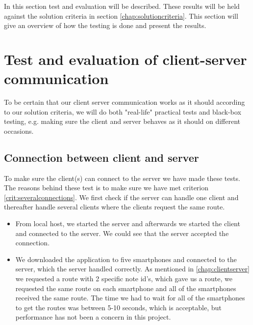 In this section test and evaluation will be described. These results will be held against the solution criteria in section \ref{chap:solutioncriteria}. This section will  give an overview of how the testing is done and present the results.

\section{Test and evaluation of client-server communication}
To be certain that our client server communication works as it should according to our solution criteria, we will do both "real-life" practical tests and black-box testing, e.g. making sure the client and server behaves as it should on different occasions.

\subsection{Connection between client and server}
To make sure the client(s) can connect to the server we have made these tests. The reasons behind these test is to make sure we have met criterion \ref{crit:severalconnections}. We first check if the server can handle one client and thereafter handle several clients where the clients request the same route. 
\begin{itemize}
	\item From local host, we started the server and afterwards we started the client and connected to the server. We could see that the server accepted the connection.
	\item We downloaded the application to five smartphones and connected to the server, which the server handled correctly. As mentioned in \autoref{chap:clientserver} we requested a route with 2 specific note id's, which gave us a route, we requested the same route on each smartphone and all of the smartphones received the same route. The time we had to wait for all of the smartphones to get the routes was between 5-10 seconds, which is acceptable, but performance has not been a concern in this project.
\end{itemize}

